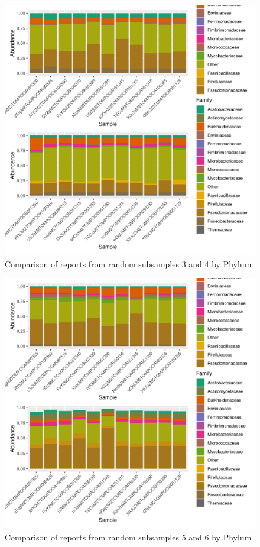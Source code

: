 \documentclass{article}
\begin{document}
\begin{figure}
\centering
\includegraphics[scale=0.8]{otus_centrales_tomate_aleatorio1_3.csv_otus_centrales_tomate_aleatorio1_4.csv_relative_abundance_Family.png}
\caption{Comparison of reports from random subsamples 3 and 4 by Phylum}
\end{figure}


\begin{figure}
\centering
\includegraphics[scale=0.8]{otus_centrales_tomate_aleatorio1_5.csv_otus_centrales_tomate_aleatorio1_6.csv_relative_abundance_Family.png}
\caption{Comparison of reports from random subsamples 5 and 6 by Phylum}
\end{figure}
\end{document}
